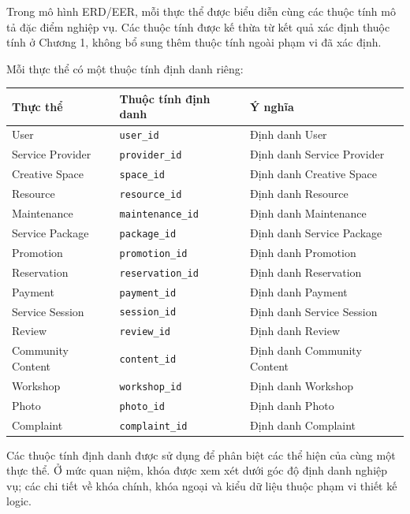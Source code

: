Trong mô hình ERD/EER, mỗi thực thể được biểu diễn cùng các thuộc tính mô tả đặc điểm nghiệp vụ. Các thuộc tính được kế thừa từ kết quả xác định thuộc tính ở Chương 1, không bổ sung thêm thuộc tính ngoài phạm vi đã xác định.

Mỗi thực thể có một thuộc tính định danh riêng:

\begin{center}
	\scriptsize
	\begin{tabular}{p{.30\linewidth} p{.30\linewidth} p{.30\linewidth}}
		\toprule
		\textbf{Thực thể} & \textbf{Thuộc tính định danh} & \textbf{Ý nghĩa} \\
		\midrule
		User & \texttt{user\_id} & Định danh User \\
		Service Provider & \texttt{provider\_id} & Định danh Service Provider \\
		Creative Space & \texttt{space\_id} & Định danh Creative Space \\
		Resource & \texttt{resource\_id} & Định danh Resource \\
		Maintenance & \texttt{maintenance\_id} & Định danh Maintenance \\
		Service Package & \texttt{package\_id} & Định danh Service Package \\
		Promotion & \texttt{promotion\_id} & Định danh Promotion \\
		Reservation & \texttt{reservation\_id} & Định danh Reservation \\
		Payment & \texttt{payment\_id} & Định danh Payment \\
		Service Session & \texttt{session\_id} & Định danh Service Session \\
		Review & \texttt{review\_id} & Định danh Review \\
		Community Content & \texttt{content\_id} & Định danh Community Content \\
		Workshop & \texttt{workshop\_id} & Định danh Workshop \\
		Photo & \texttt{photo\_id} & Định danh Photo \\
		Complaint & \texttt{complaint\_id} & Định danh Complaint \\
		\bottomrule
	\end{tabular}
\end{center}

Các thuộc tính định danh được sử dụng để phân biệt các thể hiện của cùng một thực thể. Ở mức quan niệm, khóa được xem xét dưới góc độ định danh nghiệp vụ; các chi tiết về khóa chính, khóa ngoại và kiểu dữ liệu thuộc phạm vi thiết kế logic.

